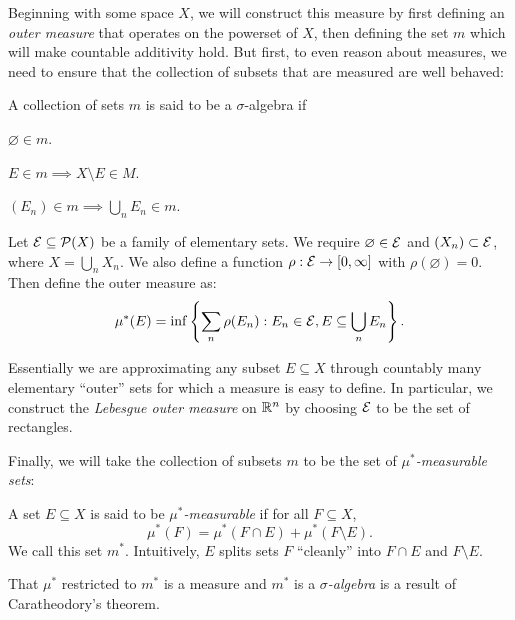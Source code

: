 \documentclass{article}
\begin{document}
Beginning with some space $X$, we will construct this measure by first defining an \emph{outer measure} that operates on the powerset of $X$, then defining the set $m$ which will make countable additivity hold. But first, to even reason about measures, we need to ensure that the collection of subsets that are measured are well behaved:
\begin{defi}
    A collection of sets $m$ is said to be a $\sigma$-algebra if 
    \begin{enum}
        \item $\varnothing \in m$.  
        \item $E \in m \implies  X \setminus  E \in M$. 
        \item $(E_n) \in m \implies \bigcup_n E_n \in m$. 
    \end{enum}
\end{defi}

\begin{defi}
    Let $\mathcal{E} \subseteq \mathcal{P} (X)$ be a family of elementary sets. We require $\varnothing \in \mathcal{E} $ and $(X_n ) \subset \mathcal{E} $, where $X = \bigcup_n  X_n $. We also define a function $\rho  : \mathcal{E} \to [0, \infty ]$ with $\rho (\varnothing ) = 0$. Then define the outer measure as:
\[
    \mu^*(E) = \inf \left\{ \sum_{n} \rho (E_n ) : E_n \in \mathcal{E} , E \subseteq \bigcup_n E_n  \right\} . 
\]
\end{defi}

Essentially we are approximating any subset $E\subseteq X $ through countably many elementary ``outer'' sets for which a measure is easy to define. In particular, we construct the \emph{Lebesgue outer measure} on $\mathbb{R}^n $ by choosing $\mathcal{E} $ to be the set of rectangles. 

Finally, we will take the collection of subsets $m$ to be the set of \emph{$\mu ^* $-measurable sets}: 
\begin{defi}[$\mu^* $-measurable]
    A set $E\subseteq X$ is said to be $\mu^* $\emph{-measurable} if for all $F\subseteq X$,
    \[
        \mu^* (F) = \mu^* (F\cap E) + \mu^* (F\setminus E). 
    \]
    We call this set $m^* $. Intuitively, $E$ splits sets $F$ ``cleanly'' into $F \cap E$ and $F \setminus  E$. 
\end{defi}
That $\mu ^* $ restricted to $m^* $ is a measure and $m^* $ is a \emph{$\sigma $-algebra} is a result of Caratheodory's theorem. 
\end{document}
